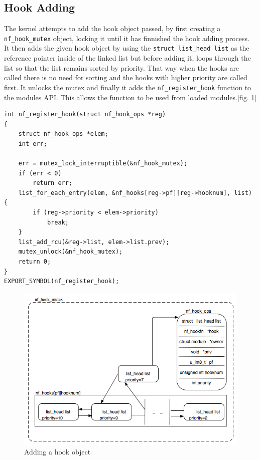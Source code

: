 \documentclass[a4paper,10pt]{article}
\newcommand{\figref}[1]{[fig. \ref{#1}]}
\begin{document}
\subsection{Hook Adding}\label{hook_add}
The kernel attempts to add the hook object passed, by first creating a \verb|nf_hook_mutex| object, locking it until it has finnished the hook adding process. It then adds the given hook object by using the \verb|struct list_head list| as the reference pointer inside of the linked list but before adding it, loops through the list so that the list remains sorted by priority. That way when the hooks are called there is no need for sorting and the hooks with higher priority are called first. It unlocks the mutex and finally it adds the \verb|nf_register_hook| function to the modules API. This allows the function to be used from loaded modules.\figref{fig:hook_object_add} 

\begin{lstlisting}
int nf_register_hook(struct nf_hook_ops *reg)
{
	struct nf_hook_ops *elem;
	int err;

	err = mutex_lock_interruptible(&nf_hook_mutex);
	if (err < 0)
		return err;
	list_for_each_entry(elem, &nf_hooks[reg->pf][reg->hooknum], list) {
		if (reg->priority < elem->priority)
			break;
	}
	list_add_rcu(&reg->list, elem->list.prev);
	mutex_unlock(&nf_hook_mutex);
	return 0;
}
EXPORT_SYMBOL(nf_register_hook);
\end{lstlisting}

\begin{figure}[H]
  \centering
  \includegraphics[totalheight=0.5\textheight]{images/hook_object_add.png}
  \caption{Adding a hook object}\label{fig:hook_object_add}
\end{figure}
\end{document}
